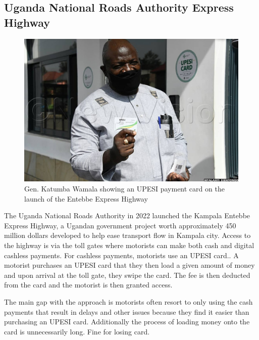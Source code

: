 \subsection{Uganda National Roads Authority Express Highway}
\begin{figure}
    \begin{center}
        \includegraphics[scale = 0.3]{images/katus}
        \caption{Gen. Katumba Wamala showing an UPESI payment card on the launch of the Entebbe Express Highway}
    \end{center}
\end{figure}
The Uganda National Roads Authority in 2022 launched the Kampala Entebbe Express Highway, a Ugandan government project worth approximately 450 million dollars developed to help ease transport flow in Kampala city. Access to the highway is via the toll gates where motorists can make both cash and digital cashless payments. For cashless payments, motorists use an UPESI card.\cite{unra_news_2022}. A motorist purchases an UPESI card that they then load a given amount of money and upon arrival at the toll gate, they swipe the card. The fee is then deducted from the card and the motorist is then granted access.

The main gap with the approach is motorists often resort to only using the cash payments that result in delays and other issues because they find it easier than purchasing an UPESI card. Additionally the process of loading money onto the card is unnecessarily long. Fine for losing card.

